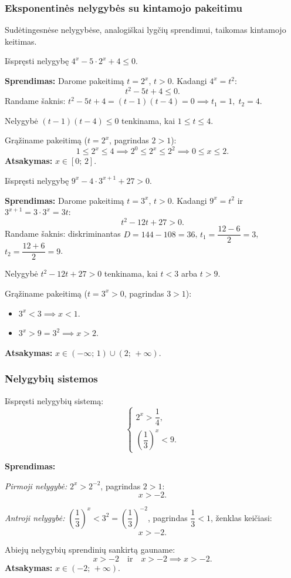 \subsubsection*{Eksponentinės nelygybės su kintamojo pakeitimu}

Sudėtingesnėse nelygybėse, analogiškai lygčių sprendimui, taikomas kintamojo keitimas.

\begin{example}
Išspręsti nelygybę $4^x - 5 \cdot 2^x + 4 \leq 0$.

\textbf{Sprendimas:} Darome pakeitimą $t = 2^x$, $t > 0$. Kadangi $4^x = t^2$:
\[
t^2 - 5t + 4 \leq 0.
\]
Randame šaknis: $t^2 - 5t + 4 = (t-1)(t-4) = 0 \implies t_1 = 1,\; t_2 = 4$.

Nelygybė $(t-1)(t-4) \leq 0$ tenkinama, kai $1 \leq t \leq 4$.

Grąžiname pakeitimą ($t = 2^x$, pagrindas $2 > 1$):
\[
1 \leq 2^x \leq 4 \implies 2^0 \leq 2^x \leq 2^2 \implies 0 \leq x \leq 2.
\]
\textbf{Atsakymas:} $x \in [0;\, 2]$.
\end{example}

\begin{example}
Išspręsti nelygybę $9^x - 4 \cdot 3^{x+1} + 27 > 0$.

\textbf{Sprendimas:} Darome pakeitimą $t = 3^x$, $t > 0$. Kadangi $9^x = t^2$ ir 
$3^{x+1} = 3 \cdot 3^x = 3t$:
\[
t^2 - 12t + 27 > 0.
\]
Randame šaknis: diskriminantas $D = 144 - 108 = 36$, 
$t_1 = \dfrac{12-6}{2} = 3$, $t_2 = \dfrac{12+6}{2} = 9$.

Nelygybė $t^2 - 12t + 27 > 0$ tenkinama, kai $t < 3$ arba $t > 9$.

Grąžiname pakeitimą ($t = 3^x > 0$, pagrindas $3 > 1$):
\begin{itemize}
    \item $3^x < 3 \implies x < 1$.
    \item $3^x > 9 = 3^2 \implies x > 2$.
\end{itemize}
\textbf{Atsakymas:} $x \in (-\infty;\, 1) \cup (2;\, +\infty)$.
\end{example}

\subsubsection*{Nelygybių sistemos}

\begin{example}
Išspręsti nelygybių sistemą:
\[
\begin{cases}
2^{x} > \dfrac{1}{4}, \\[6pt]
\left(\dfrac{1}{3}\right)^{x} < 9.
\end{cases}
\]

\textbf{Sprendimas:}

\textit{Pirmoji nelygybė:} $2^x > 2^{-2}$, pagrindas $2 > 1$:
\[
x > -2.
\]

\textit{Antroji nelygybė:} $\left(\dfrac{1}{3}\right)^x < 3^2 = \left(\dfrac{1}{3}\right)^{-2}$, 
pagrindas $\dfrac{1}{3} < 1$, ženklas keičiasi:
\[
x > -2.
\]

Abiejų nelygybių sprendinių sankirtą gauname:
\[
x > -2 \quad \text{ir} \quad x > -2 \implies x > -2.
\]
\textbf{Atsakymas:} $x \in (-2;\, +\infty)$.
\end{example}

